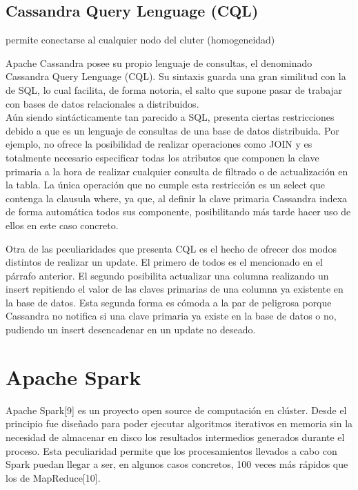 \subsection{Cassandra Query Lenguage (CQL)}

permite conectarse al cualquier nodo del cluter (homogeneidad)

Apache Cassandra posee su propio lenguaje de consultas, el denominado Cassandra Query Lenguage (CQL). Su sintaxis guarda una gran similitud con la de SQL, lo cual facilita, de forma notoria, el salto que supone pasar de trabajar con bases de datos relacionales a distribuidos.\\

Aún siendo sintácticamente  tan parecido a SQL, presenta ciertas restricciones debido a que es un lenguaje de consultas de una base de datos distribuida. Por ejemplo, no ofrece la posibilidad de realizar operaciones como JOIN y es totalmente necesario especificar todas los atributos que componen la clave primaria a la hora de realizar cualquier consulta de filtrado o de actualización en la tabla. La única operación que no cumple esta restricción es un select que contenga la clausula where, ya que, al definir la clave primaria Cassandra indexa de forma automática todos sus componente, posibilitando más tarde  hacer uso de ellos en este caso concreto.

Otra de las peculiaridades que presenta CQL es el hecho de ofrecer dos modos distintos de realizar un update. El primero de todos es el mencionado en el párrafo anterior. El segundo posibilita actualizar una columna realizando un insert repitiendo el valor de las claves primarias de una columna ya existente en la base de datos. Esta segunda forma es cómoda a la par de peligrosa porque Cassandra no notifica si una clave primaria ya existe en la base de datos o no, pudiendo un insert desencadenar en un update no deseado.  


\section{Apache Spark}

Apache Spark[9] es un proyecto open source de computación en clúster. Desde el principio fue diseñado para poder ejecutar algoritmos iterativos en memoria sin la necesidad de almacenar en disco los resultados intermedios generados durante el proceso. Esta peculiaridad permite que los procesamientos llevados a cabo con Spark puedan llegar a ser, en algunos casos concretos, 100 veces más rápidos que los de MapReduce[10].\\

